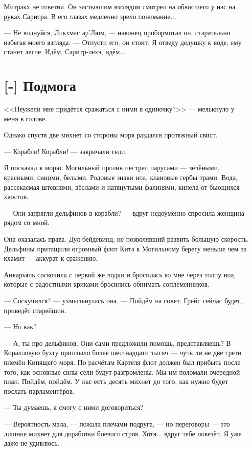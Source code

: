 Митракх не ответил.
Он застывшим взглядом смотрел на обвисшего у нас на руках Саритра.
В его глазах медленно зрело понимание...

--- Не волнуйся, Ликхмас ар’Люм, --- наконец пробормотал он, старательно избегая моего взгляда.
--- Отпусти его, он стоит.
Я отведу дедушку к воде, ему станет легче.
Идём, Саритр-лехэ, идём...

\section{[-] Подмога}

\textspace

<<Неужели мне придётся сражаться с ними в одиночку?>> --- мелькнуло у меня в голове.

Однако спустя две михнет со стороны моря раздался протяжный свист.

--- Корабли! Корабли! --- закричали сели.

Я поскакал к морю.
Могильный пролив пестрел парусами --- зелёными, красными, синими, белыми.
Родовые знаки ноа, клановые гербы трами.
Вода, рассекаемая штевнями, вёслами и натянутыми фалинями, кипела от бьющихся хвостов.

--- Они запрягли дельфинов в корабли? --- вдруг недоумённо спросила женщина рядом со мной.

Она оказалась права.
Дул бейдевинд, не позволявший развить большую скорость.
Дельфины притащили огромный флот Кита к Могильному берегу меньше чем за кхамит --- аккурат к сражению.

Анкарьяль соскочила с первой же лодки и бросилась ко мне через толпу ноа, которые с радостными криками бросились обнимать соплеменников.

--- Соскучился? --- ухмыльнулась она.
--- Пойдём на совет.
Грейс сейчас будет, приведёт старейшин.

--- Но как?

--- А, ты про дельфинов.
Они сами предложили помощь, представляешь?
В Коралловую бухту приплыло более шестнадцати тысяч --- чуть ли не две трети племён Кипящего моря.
По расчётам Картеля флот должен был прибыть после того, как основные силы сели будут разгромлены.
Мы им поломали очередной план.
Пойдём, пойдём.
У нас есть десять михнет до того, как нужно будет послать парламентёров.

--- Ты думаешь, я смогу с ними договориться?

--- Вероятность мала, --- пожала плечами подруга, --- но переговоры --- это лишние михнет для доработки боевого строя.
Хотя... вдруг тебе повезёт.
Я уже даже не удивлюсь.

